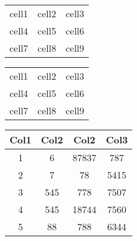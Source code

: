 \documentclass{article}
\begin{document}
\vspace{1cm}

\begin{center}
\begin{tabular}{ c c c }
  cell1 & cell2 & cell3 \\ 
  cell4 & cell5 & cell6 \\  
  cell7 & cell8 & cell9    
\end{tabular}
\end{center}

\vspace{1cm}

\begin{center}
\begin{tabular}{ | c | c | c | } 
  \hline
  cell1 & cell2 & cell3 \\ 
  cell4 & cell5 & cell6 \\ 
  cell7 & cell8 & cell9 \\ 
  \hline
\end{tabular}
\end{center}

\vspace{1cm}

\begin{center}
 \begin{tabular}{||c c c c||} 
 \hline
 Col1 & Col2 & Col2 & Col3 \\ [0.5ex] 
 \hline\hline
 1 & 6 & 87837 & 787 \\ 
 \hline
 2 & 7 & 78 & 5415 \\
 \hline
 3 & 545 & 778 & 7507 \\
 \hline
 4 & 545 & 18744 & 7560 \\
 \hline
 5 & 88 & 788 & 6344 \\ [1ex] 
 \hline
 \end{tabular}
\end{center}

\vspace{1cm}
\end{document}
